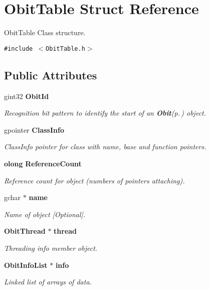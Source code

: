 \section{Obit\-Table Struct Reference}
\label{structObitTable}
Obit\-Table Class structure.  


{\tt \#include $<$Obit\-Table.h$>$}

\subsection*{Public Attributes}
\begin{CompactItemize}
\item 
gint32 {\bf Obit\-Id}
\begin{CompactList}\small\item\em Recognition bit pattern to identify the start of an {\bf Obit}{\rm (p.\,\pageref{structObit})} object. \item\end{CompactList}\item 
gpointer {\bf Class\-Info}
\begin{CompactList}\small\item\em Class\-Info pointer for class with name, base and function pointers. \item\end{CompactList}\item 
{\bf olong} {\bf Reference\-Count}
\begin{CompactList}\small\item\em Reference count for object (numbers of pointers attaching). \item\end{CompactList}\item 
gchar $\ast$ {\bf name}
\begin{CompactList}\small\item\em Name of object [Optional]. \item\end{CompactList}\item 
{\bf Obit\-Thread} $\ast$ {\bf thread}
\begin{CompactList}\small\item\em Threading info member object. \item\end{CompactList}\item 
{\bf Obit\-Info\-List} $\ast$ {\bf info}
\begin{CompactList}\small\item\em Linked list of arrays of data. \item\end{CompactList}\item 

\end{CompactItemize}
